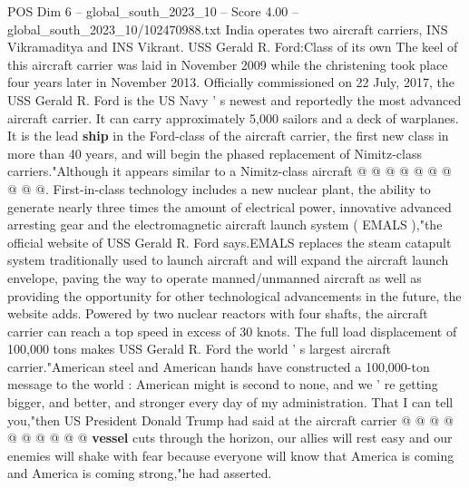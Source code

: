 \begin{textsample}{POS Dim 6 – global\_south\_2023\_10 – Score 4.00 – global\_south\_2023\_10/102470988.txt}
India operates two aircraft carriers, INS Vikramaditya and INS Vikrant.
USS Gerald R.
Ford:Class of its own The keel of this aircraft carrier was laid in November 2009 while the christening took place four years later in November 2013.
Officially commissioned on 22 July, 2017, the USS Gerald R.
Ford is the US Navy ' s newest and reportedly the most advanced aircraft carrier.
It can carry approximately 5,000 sailors and a deck of warplanes.
It is the lead \textbf{ship} in the Ford-class of the aircraft carrier, the first new class in more than 40 years, and will begin the phased replacement of Nimitz-class carriers."Although it appears similar to a Nimitz-class aircraft @ @ @ @ @ @ @ @ @ @.
First-in-class technology includes a new nuclear plant, the ability to generate nearly three times the amount of electrical power, innovative advanced arresting gear and the electromagnetic aircraft launch system ( EMALS ),"the official website of USS Gerald R.
Ford says.EMALS replaces the steam catapult system traditionally used to launch aircraft and will expand the aircraft launch envelope, paving the way to operate manned/unmanned aircraft as well as providing the opportunity for other technological advancements in the future, the website adds.
Powered by two nuclear reactors with four shafts, the aircraft carrier can reach a top speed in excess of 30 knots.
The full load displacement of 100,000 tons makes USS Gerald R.
Ford the world ' s largest aircraft carrier."American steel and American hands have constructed a 100,000-ton message to the world : American might is second to none, and we ' re getting bigger, and better, and stronger every day of my administration.
That I can tell you,"then US President Donald Trump had said at the aircraft carrier @ @ @ @ @ @ @ @ @ @ \textbf{vessel} cuts through the horizon, our allies will rest easy and our enemies will shake with fear because everyone will know that America is coming and America is coming strong,"he had asserted.

\end{textsample}
